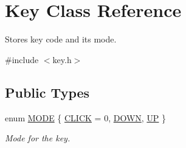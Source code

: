 \hypertarget{class_key}{\section{Key Class Reference}
\label{class_key}
}


Stores key code and its mode.  




{\ttfamily \#include $<$key.\-h$>$}

\subsection*{Public Types}
\begin{DoxyCompactItemize}
\item 
enum \hyperlink{class_key_a6f8c4beba5584878553ee5b3077be416}{M\-O\-D\-E} \{ \hyperlink{class_key_a6f8c4beba5584878553ee5b3077be416a921a98871b9bca60fb5abbfb2cbaa4dd}{C\-L\-I\-C\-K} =  0, 
\hyperlink{class_key_a6f8c4beba5584878553ee5b3077be416ab0381f960318045ea8221f73863fd499}{D\-O\-W\-N}, 
\hyperlink{class_key_a6f8c4beba5584878553ee5b3077be416a94528a9df1ce9f0789fb5e33780424f1}{U\-P}
 \}
\begin{DoxyCompactList}\small\item\em Mode for the key. \end{DoxyCompactList}\end{DoxyCompactItemize}

